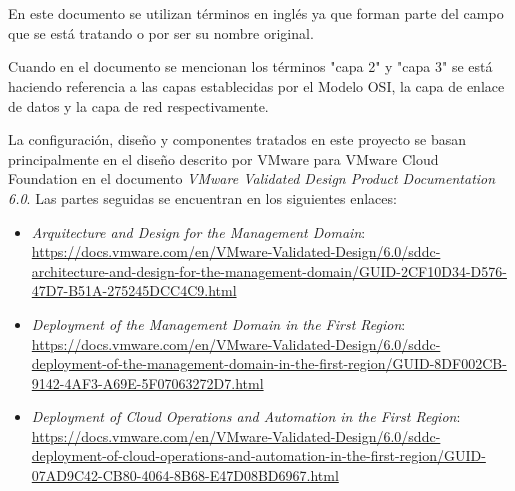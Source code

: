\chapter*{\nomeanexonotas}
\label{chap:notas}
\begin{description}

    \item En este documento se utilizan términos en inglés ya que forman parte del campo que se está tratando o por ser su nombre original.
    \item Cuando en el documento se mencionan los términos "capa 2" y "capa 3" se está haciendo referencia a las capas establecidas por el Modelo OSI, la capa de enlace de datos y la capa de red respectivamente.
    \item La configuración, diseño y componentes tratados en este proyecto se basan principalmente en el diseño descrito por VMware para VMware Cloud Foundation en el documento \textit{VMware Validated Design Product Documentation 6.0}. Las partes seguidas se encuentran en los siguientes enlaces: 
        \begin{itemize}
            \item \textit{Arquitecture and Design for the Management Domain}: \url{https://docs.vmware.com/en/VMware-Validated-Design/6.0/sddc-architecture-and-design-for-the-management-domain/GUID-2CF10D34-D576-47D7-B51A-275245DCC4C9.html}
            \item \textit{Deployment of the Management Domain in the First Region}: \url{https://docs.vmware.com/en/VMware-Validated-Design/6.0/sddc-deployment-of-the-management-domain-in-the-first-region/GUID-8DF002CB-9142-4AF3-A69E-5F07063272D7.html}
            \item \textit{Deployment of Cloud Operations and Automation in the First Region}: \url{https://docs.vmware.com/en/VMware-Validated-Design/6.0/sddc-deployment-of-cloud-operations-and-automation-in-the-first-region/GUID-07AD9C42-CB80-4064-8B68-E47D08BD6967.html}
        \end{itemize}
\end{description}